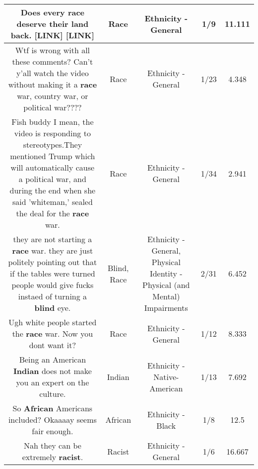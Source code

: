 \documentclass[11pt]{article}
\newlength\mylength
\begin{document}
\begin{center}
\begin{longtable}{|C{.65\mylength}|C{.30\mylength}|C{.12\mylength}|C{.12\mylength}|C{.12\mylength}|}
  \small Does every \textbf{race} deserve their land back. [LINK]  [LINK] \normalsize   & Race & Ethnicity - General & 1/9 & 11.111 \\  \hline
  \small Wtf is wrong with all these comments? Can't y'all watch the video without making it a \textbf{race} war, country war, or political war????\normalsize   & Race & Ethnicity - General & 1/23 & 4.348 \\  \hline
  \small Fish buddy I mean, the video is responding to stereotypes.They mentioned Trump which will automatically cause a political war, and during the end when she said 'whiteman,' sealed the deal for the \textbf{race} war.\normalsize   & Race & Ethnicity - General & 1/34 & 2.941 \\  \hline
  \small {} they are not starting a \textbf{race} war. they are just politely pointing out that if the tables were turned people would give fucks instaed of turning a \textbf{blind} eye.\normalsize   & Blind, Race & Ethnicity - General, Physical Identity - Physical (and Mental) Impairments & 2/31 & 6.452 \\  \hline
  \small Ugh white people started the \textbf{race} war. Now you dont want it?\normalsize   & Race & Ethnicity - General & 1/12 & 8.333 \\  \hline
  \small Being an American \textbf{Indian} does not make you an expert on the culture.\normalsize   & Indian & Ethnicity - Native-American & 1/13 & 7.692 \\  \hline
  \small So \textbf{African} Americans included? Okaaaay seems fair enough.\normalsize   & African & Ethnicity - Black & 1/8 & 12.5 \\  \hline
  \small Nah they can be extremely \textbf{racist}.\normalsize   & Racist & Ethnicity - General & 1/6 & 16.667 \\  \hline

\end{longtable}
\end{center}
\end{document}
